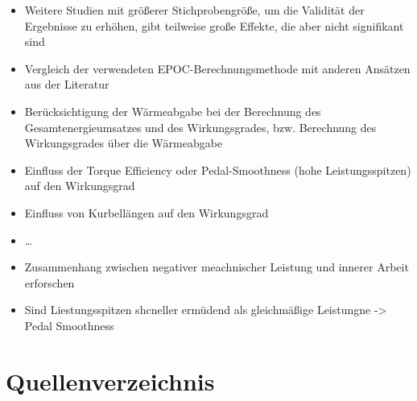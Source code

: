 \documentclass[
  letterpaper,
  DIV=11]{scrartcl}
\providecommand{\tightlist}{%
  \setlength{\itemsep}{0pt}\setlength{\parskip}{0pt}}\usepackage{longtable,booktabs,array}
\newlength{\cslhangindent}
\newenvironment{CSLReferences}[2] %
 {\begin{list}{}{%
  \setlength{\itemindent}{0pt}
  \setlength{\leftmargin}{0pt}
  \setlength{\parsep}{0pt}
  \ifodd #1
   \setlength{\leftmargin}{\cslhangindent}
   \setlength{\itemindent}{-1\cslhangindent}
  \fi
  \setlength{\itemsep}{#2\baselineskip}}}
 {\end{list}}
\begin{document}
\begin{itemize}
\tightlist
\item
  Weitere Studien mit größerer Stichprobengröße, um die Validität der
  Ergebnisse zu erhöhen, gibt teilweise große Effekte, die aber nicht
  signifikant sind
\item
  Vergleich der verwendeten EPOC-Berechnungsmethode mit anderen Ansätzen
  aus der Literatur
\item
  Berücksichtigung der Wärmeabgabe bei der Berechnung des
  Gesamtenergieumsatzes und des Wirkungsgrades, bzw. Berechnung des
  Wirkungsgrades über die Wärmeabgabe
\item
  Einfluss der Torque Efficiency oder Pedal-Smoothness (hohe
  Leistungsspitzen) auf den Wirkungsgrad
\item
  Einfluss von Kurbellängen auf den Wirkungsgrad
\item
  \ldots{}
\item
  Zusammenhang zwischen negativer meachnischer Leistung und innerer
  Arbeit erforschen
\item
  Sind Liestungsspitzen shcneller ermüdend als gleichmäßige Leistungne
  -\textgreater{} Pedal Smoothness
\end{itemize}

\section{Quellenverzeichnis}\label{quellenverzeichnis}

\label{refs}
\begin{CSLReferences}{0}{1}
\end{CSLReferences}
\end{document}
